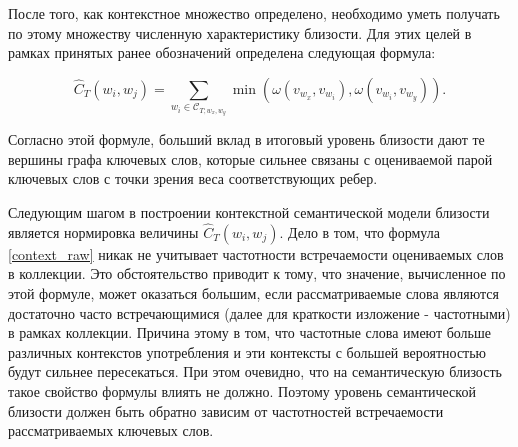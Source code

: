 После того, как контекстное множество определено, необходимо уметь получать по этому множеству численную характеристику близости. Для этих целей в рамках принятых ранее обозначений определена следующая формула:

\begin{equation}\label{context_raw}
    \hat{C}_T(w_i, w_j) = \sum_{w_i \in \mathcal{C}_{T;w_x, w_y}} \min(\omega(v_{w_x}, v_{w_i}), \omega(v_{w_i}, v_{w_y})).
\end{equation}

Согласно этой формуле, больший вклад в итоговый уровень близости дают те вершины графа ключевых слов, которые сильнее связаны с оцениваемой парой ключевых слов с точки зрения веса соответствующих ребер.

Следующим шагом в построении контекстной семантической модели близости является нормировка величины $\hat{C}_T(w_i, w_j)$. Дело в том, что формула \ref{context_raw} никак не учитывает частотности встречаемости оцениваемых слов в коллекции. Это обстоятельство приводит к тому, что значение, вычисленное по этой формуле, может оказаться большим, если рассматриваемые слова являются достаточно часто встречающимися (далее для краткости изложение - частотными) в рамках коллекции. Причина этому в том, что частотные слова имеют больше различных контекстов употребления и эти контексты с большей вероятностью будут сильнее пересекаться. При этом очевидно, что на семантическую близость такое свойство формулы влиять не должно. Поэтому уровень семантической близости должен быть обратно зависим от частотностей встречаемости рассматриваемых ключевых слов.



